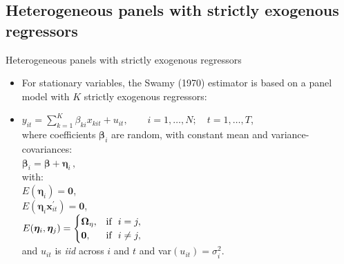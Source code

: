 \documentclass[usenames,dvipsnames]{beamer}
\begin{document}
\subsection*{Heterogeneous panels with strictly exogenous regressors}
\begin{frame}{Heterogeneous panels with strictly exogenous regressors}
    \begin{itemize}
        \item For stationary variables, the Swamy (1970) estimator is based on a panel model with $K$ strictly exogenous regressors:\\ \medskip 
        \item $y_{it}=\displaystyle\sum_{k=1}^K \beta_{ki} x_{kit} + u_{it}, \qquad i=1,\dots,N;\quad t=1,\dots,T$,\\ \medskip
        where coefficients $\bm{\beta}_{i}$ are random, with constant mean and variance-covariances:\\ \medskip
        $\bm{\beta}_{i}=\bm{\beta}+\bm{\eta}_i \, ,$ \\ \medskip
        with:\\ \medskip
        \quad $E(\bm{\eta}_i)=\bm{0}$,\\
        \quad $E(\bm{\eta}_i \bm{x}_{it}^{\prime})=\bm{0}$,\\
        \quad $E(\bm{\eta}_i,\bm{\eta}_j)= 
        \begin{cases}
            \bm{\Omega}_{\eta}, & \textnormal{if~~} i=j,\\
            \bm{0}, & \textnormal{if~~} i \neq j,
        \end{cases}$ \\
        \quad and $u_{it}$ is \textit{iid} across $i$ and $t$ and var$(u_{it})=\sigma^2_i$.
    \end{itemize}
\end{frame}
\end{document}

